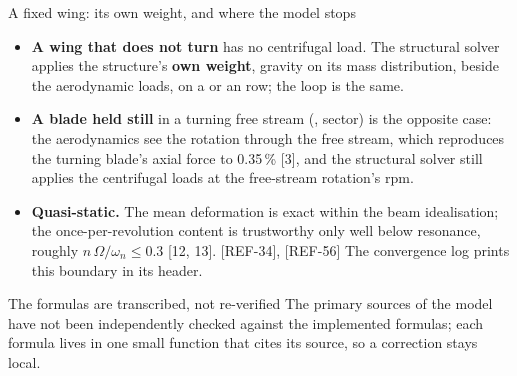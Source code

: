 \begin{frame}{A fixed wing: its own weight, and where the model stops}
\begin{itemize}\small
  \item \textbf{A wing that does not turn} has no centrifugal load. The
        structural solver applies the structure's \textbf{own weight}, gravity
        on its mass distribution, beside the aerodynamic loads, on a
         or an  row; the loop is the same.
  \item \textbf{A blade held still} in a turning free stream
        (, sector) is the opposite case: the aerodynamics
        see the rotation through the free stream, which reproduces the
        turning blade's axial force to 0.35\,\% [3], and the structural solver
        still applies the centrifugal loads at the free-stream rotation's rpm.
  \item \textbf{Quasi-static.} The mean deformation is exact within the beam
        idealisation; the once-per-revolution content is trustworthy only well
        below resonance, roughly \(n\,\Omega / \omega_n \le 0.3\) [12, 13]. [REF-34], [REF-56]
        The convergence log prints this boundary in its header.
\end{itemize}
\begin{alertblock}{The formulas are transcribed, not re-verified}
\small The primary sources of the model have not been independently checked
against the implemented formulas; each formula lives in one small function
that cites its source, so a correction stays local.
\end{alertblock}
\end{frame}

